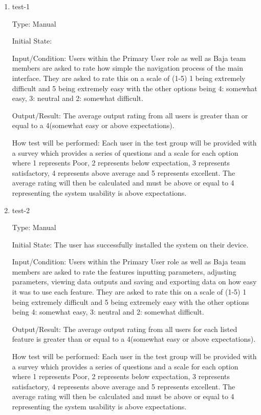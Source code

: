\documentclass[12pt, titlepage]{article}
\begin{document}
\begin{enumerate}

\item{test-1\\}

Type: Manual
					
Initial State: 
					
Input/Condition: Users within the Primary User role as well as Baja team members are asked to rate how simple the navigation process of the main interface. 
They are asked to rate this on a scale of (1-5) 1 being extremely difficult and 5 being extremely easy with the other options being 4: somewhat easy, 3: neutral and 2: somewhat difficult. 
					
Output/Result: The average output rating from all users is greater than or equal to a 4(somewhat easy or above expectations).
					
How test will be performed: Each user in the test group will be provided with a survey which provides a series of questions and a scale for each option where 1 represents Poor, 2 represents below expectation, 3 represents satisfactory, 4 represents above average and 5 represents excellent.
The average rating will then be calculated and must be above or equal to 4 representing the system usability is above expectations.  

\item{test-2\\}
  
Type: Manual
            
Initial State: The user has successfully installed the system on their device.
            
Input/Condition: Users within the Primary User role as well as Baja team members are asked to rate the features inputting parameters, adjusting parameters, viewing data outputs and saving and exporting data on how easy it was to use each feature.
They are asked to rate this on a scale of (1-5) 1 being extremely difficult and 5 being extremely easy with the other options being 4: somewhat easy, 3: neutral and 2: somewhat difficult. 
            
Output/Result: The average output rating from all users for each listed feature is greater than or equal to a 4(somewhat easy or above expectations).
            
How test will be performed: Each user in the test group will be provided with a survey which provides a series of questions and a scale for each option where 1 represents Poor, 2 represents below expectation, 3 represents satisfactory, 4 represents above average and 5 represents excellent.
The average rating will then be calculated and must be above or equal to 4 representing the system usability is above expectations. 
  
\end{enumerate}
\end{document}
